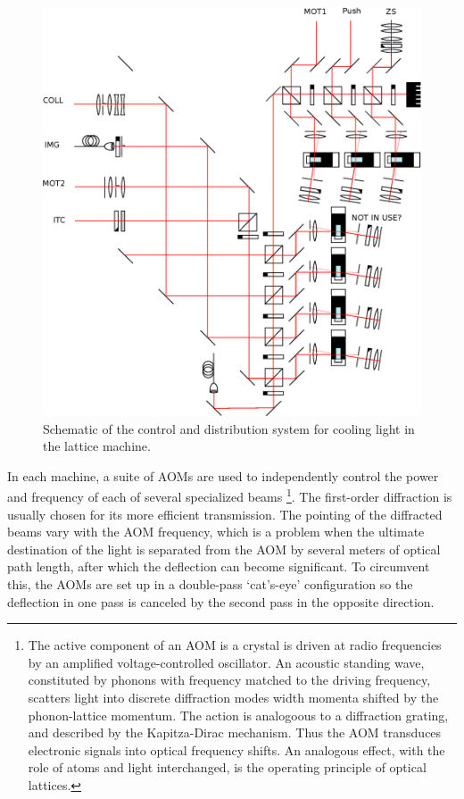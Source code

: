 	\begin{figure}
		\centering
		\includegraphics[width=\textwidth]{fig/apparatus/lattice_cooling_optics}
		\caption{Schematic of the control and distribution system for cooling light in the lattice machine.}
		\label{fig:lattice_cooling_optics}
	\end{figure}
	In each machine, a suite of AOMs are used to independently control the power and frequency of each of several specialized beams \footnote{The active component of an AOM is a crystal is driven at radio frequencies by an amplified voltage-controlled oscillator. An acoustic standing wave, constituted by phonons with frequency matched to the driving frequency, scatters light into discrete diffraction modes width momenta shifted by the phonon-lattice momentum. The action is analogoous to a diffraction grating, and described by the Kapitza-Dirac mechanism. Thus the AOM transduces electronic signals into optical frequency shifts. An analogous effect, with the role of atoms and light interchanged, is the operating principle of optical lattices.}. The first-order diffraction is usually chosen for its more efficient transmission. The pointing of the diffracted beams vary with the AOM frequency, which is a problem when the ultimate destination of the light is separated from the AOM by several meters of optical path length, after which the deflection can become significant. To circumvent this, the AOMs are set up in a double-pass `cat's-eye' configuration so the deflection in one pass is canceled by the second pass in the opposite direction.
	
